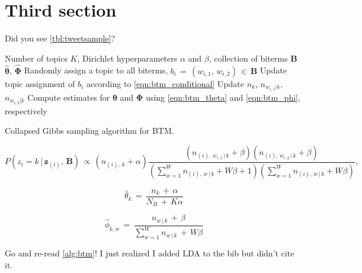 \clearpage

\restoregeometry

\section{Third section}

\lipsum[12-13]

Did you see \autoref{tbl:tweetsample}?

\begin{algorithm}[h]
	\small
	\begin{algorithmic}
		\REQUIRE Number of topics $K$, Dirichlet hyperparameters $\alpha$ and $\beta$, collection
		of biterms $\mathbf{B}$
		\ENSURE $\widehat{\bm{\theta}}$, $\widehat{\bm{\Phi}}$
		\STATE Randomly assign a topic to all biterms, $b_{i} \,=\, (w_{i,1},\,w_{i,2}) \,\in\, 
		\mathbf{B}$
				\STATE Update topic assignment of $b_{i}$ according to \autoref{eqn:btm_conditional}
				\STATE Update $n_{k}$, $n_{w_{i,1}|k}$, $n_{w_{i,2}|k}$
			\ENDFOR
		\ENDFOR
		\STATE Compute estimates for $\bm{\theta}$ and $\bm{\Phi}$ using \autoref{eqn:btm_theta} and
		\autoref{eqn:btm_phi}, respectively
	\end{algorithmic}
	\caption{\label{alg:btm}Collapsed Gibbs sampling algorithm for BTM.}
\end{algorithm}

\begin{equation}
P(z_{i}=k\,|\,\mathbf{z}_{(i)},\,\textbf{B}) \,\propto\, (n_{(i),\,k} + \alpha)
\frac{(n_{(i),\,w_{i,1}\,|\,k} + \beta)(n_{(i),\,w_{i,2}\,|\,k} + \beta)}
{(\sum_{w=1}^{W}n_{(i),\,w\,|\,k} + W\beta + 1)(\sum_{w=1}^{W}n_{(i),\,w\,|\,k} + W\beta)},
\label{eqn:btm_conditional}
\end{equation}

\begin{equation}
\widehat{\theta}_{k} \,=\, \frac{n_{k} \,+\, \alpha}{N_{B} \,+\, K\alpha}
\label{eqn:btm_theta}
\end{equation}

\begin{equation}
\widehat{\phi}_{k,w} \,=\, \frac{n_{w\,|\,k} \,+\, \beta}{\sum_{w=1}^{W}n_{w\,|\,k} \,+\, W\beta}
\label{eqn:btm_phi}
\end{equation}

\lipsum[14] Go and re-read \autoref{alg:btm}! I just realized I added LDA to the bib but didn't
cite it\supercite{lda}.

\printbibliography[heading=subbibintoc,title={Cited},keyword={cited}]

\nocite{*}
\printbibliography[heading=subbibintoc,title={Not cited},keyword={uncited}]

